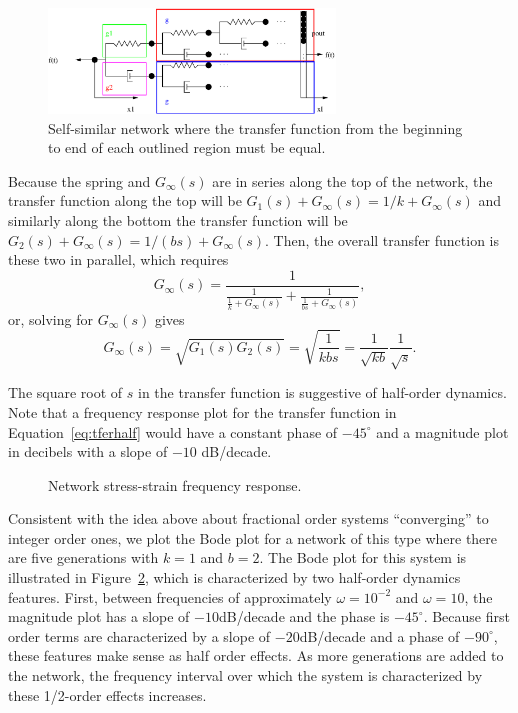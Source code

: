 \begin{example}
  \begin{figure}
	\centering
	\includegraphics[width=3in]{figs/structure2}
	\caption{Self-similar network where the transfer function from the beginning to end of each outlined region must be equal.}
	\label{fig:selfsimilar}
  \end{figure}

  Because the spring and $G_\infty(s)$ are in series along the top of the network, the transfer function along the top will be $G_1(s) + G_\infty(s) = 1/k + G_\infty(s)$ and similarly along the bottom the transfer function will be $G_2(s) + G_\infty(s) = 1/(bs) + G_\infty(s)$. Then, the overall transfer function is these two in parallel, which requires
  \begin{equation*}
	G_\infty(s) = \frac{1}{\frac{1}{\frac{1}{k} + G_\infty(s)} + \frac{1}{\frac{1}{bs} + G_\infty(s)}},
  \end{equation*}
  or, solving for $G_\infty(s)$ gives
  \begin{equation}
	G_\infty(s) = \sqrt{G_1(s) G_2(s)} =\sqrt{\frac{1}{k b s }} = \frac{1}{\sqrt{kb}} \frac{1}{\sqrt{s}}.
	\label{eq:tferhalf}
  \end{equation}

  The square root of $s$ in the transfer function is suggestive of half-order dynamics. Note that a frequency response plot for the transfer function in Equation~\ref{eq:tferhalf} would have a constant phase of $-45^\circ$ and a magnitude plot in decibels with a slope of $-10$ dB/decade.

  \begin{figure}
	\centering
	
	\caption{Network stress-strain frequency response.}
	\label{fig:bodeelement}
  \end{figure}

Consistent with the idea above about fractional order systems ``converging'' to
integer order ones, we plot the Bode plot for a network of this type where there
are five generations with $k =1$ and $b=2$. The Bode plot for this system is
illustrated in Figure~\ref{fig:bodeelement}, which is characterized by two
half-order dynamics features. First, between frequencies of approximately
$\omega = 10^{-2}$ and $\omega = 10$, the magnitude plot has a slope of
$-10$dB/decade and the phase is $-45^\circ$. Because first order terms are
characterized by a slope of $-20$dB/decade and a phase of $-90^\circ$, these
features make sense as half order effects. As more generations are added to the
network, the frequency interval over which the system is characterized by these
1/2-order effects increases. 

\end{example}

